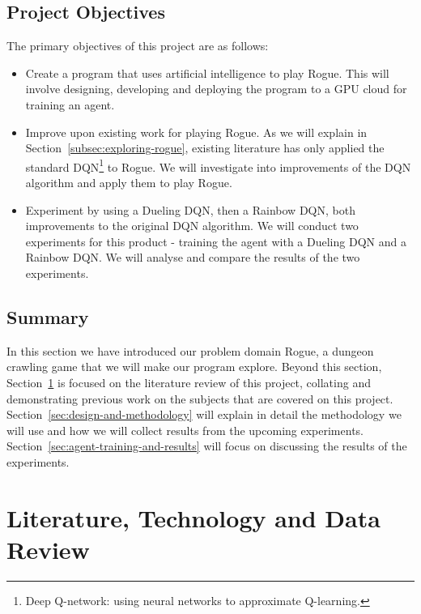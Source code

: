 \documentclass[12pt,a4paper]{article}
\begin{document}
    \subsection{Project Objectives}\label{subsec:objectives}
    The primary objectives of this project are as follows:
    \begin{itemize}
        \item Create a program that uses artificial intelligence to play Rogue.
        This will involve designing, developing and deploying the program to a GPU cloud for training an agent.
        \item Improve upon existing work for playing Rogue.
        As we will explain in Section~\ref{subsec:exploring-rogue}, existing literature has only applied the standard
        DQN\footnote{Deep Q-network: using neural networks to approximate Q-learning.} to Rogue.
        We will investigate into improvements of the DQN algorithm and apply them to play Rogue.
        \item Experiment by using a Dueling DQN, then a Rainbow DQN, both improvements to the original DQN algorithm.
        We will conduct two experiments for this product - training the agent with a Dueling DQN and a Rainbow DQN.
        We will analyse and compare the results of the two experiments.
    \end{itemize}

    \subsection{Summary}\label{subsec:summary1}
    In this section we have introduced our problem domain Rogue, a dungeon crawling game that we will make our program explore.
    Beyond this section, Section~\ref{sec:literature-technology-and-data-review} is focused on the literature review of
    this project, collating and demonstrating previous work on the subjects that are covered on this project.
    Section~\ref{sec:design-and-methodology} will explain in detail the methodology we will use and how we will collect
    results from the upcoming experiments.
    Section~\ref{sec:agent-training-and-results} will focus on discussing the results of the experiments.

    \section{Literature, Technology and Data Review}\label{sec:literature-technology-and-data-review}
\end{document}
